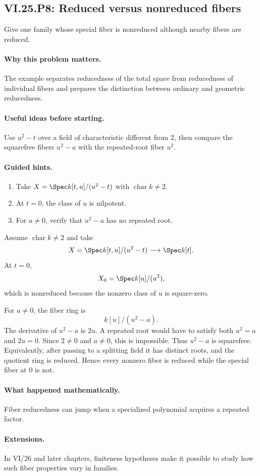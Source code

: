 \subsection*{VI.25.P8: Reduced versus nonreduced fibers}
\begin{problem}\label{prob:vi25-p08}
Give one family whose special fiber is nonreduced although nearby fibers are reduced.
\end{problem}

\ifdefined\FullProblemDossiers
\paragraph{Why this problem matters.}
The example separates reducedness of the total space from reducedness of individual fibers and prepares the distinction between ordinary and geometric reducedness.

\paragraph{Useful ideas before starting.}
Use \(u^2-t\) over a field of characteristic different from \(2\), then compare the squarefree fibers \(u^2-a\) with the repeated-root fiber \(u^2\).

\paragraph{Guided hints.}
\begin{enumerate}
\item Take \(X=\Spec k[t,u]/(u^2-t)\) with \(\operatorname{char}k\ne2\).
\item At \(t=0\), the class of \(u\) is nilpotent.
\item For \(a\ne0\), verify that \(u^2-a\) has no repeated root.
\end{enumerate}

\begin{solution}
Assume \(\operatorname{char}k\ne2\) and take
\[
X=\Spec k[t,u]/(u^2-t)\longrightarrow\Spec k[t].
\]
At \(t=0\),
\[
X_0=\Spec k[u]/(u^2),
\]
which is nonreduced because the nonzero class of \(u\) is square-zero.

For \(a\ne0\), the fiber ring is
\[
k[u]/(u^2-a).
\]
The derivative of \(u^2-a\) is \(2u\).  A repeated root would have to satisfy both \(u^2=a\) and \(2u=0\).  Since \(2\ne0\) and \(a\ne0\), this is impossible.  Thus \(u^2-a\) is squarefree.  Equivalently, after passing to a splitting field it has distinct roots, and the quotient ring is reduced.  Hence every nonzero fiber is reduced while the special fiber at \(0\) is not.
\end{solution}

\paragraph{What happened mathematically.}
Fiber reducedness can jump when a specialized polynomial acquires a repeated factor.

\paragraph{Extensions.}
In VI/26 and later chapters, finiteness hypotheses make it possible to study how such fiber properties vary in families.
\fi
